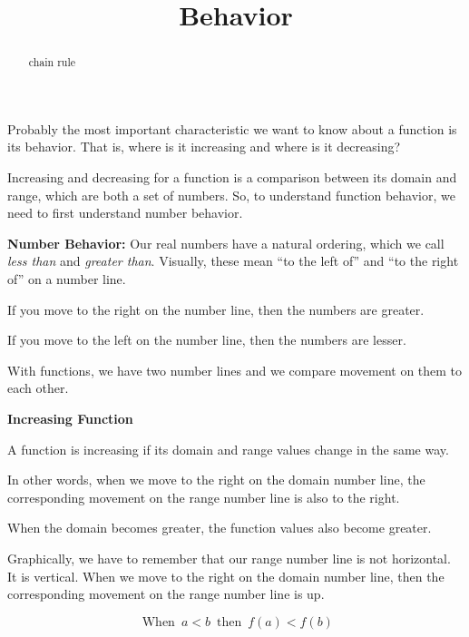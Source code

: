 \documentclass{ximera}
\title{Behavior}
\begin{document}
\begin{abstract}
chain rule
\end{abstract}
\maketitle



Probably the most important characteristic we want to know about a function is its behavior.  That is, where is it increasing and where is it decreasing? 




Increasing and decreasing for a function is a comparison between its domain and range, which are both a set of numbers.  So, to understand function behavior, we need to first understand number behavior.



\textbf{\textcolor{blue!55!black}{Number Behavior:}}  Our real numbers have a natural ordering, which we call \textit{less than} and \textit{greater than}.  Visually, these mean ``to the left of'' and ``to the right of'' on a number line. 

If you move to the right on the number line, then the numbers are greater. 

If you move to the left on the number line, then the numbers are lesser. 











With functions, we have two number lines and we compare movement on them to each other. 










\begin{template} \textbf{\textcolor{blue!55!black}{Increasing Function}} 


A function is increasing if its domain and range values change in the same way. 


In other words, when we move to the right on the domain number line, the corresponding movement on the range number line is also to the right.

When the domain becomes greater, the function values also become greater.


Graphically, we have to remember that our range number line is not horizontal.  It is vertical.  When we move to the right on the domain number line, then the corresponding movement on the range number line is up.



\[
\text{ When } \,  a < b \, \text{ then } \, f(a) < f(b)
\]


\end{template}
\end{document}
